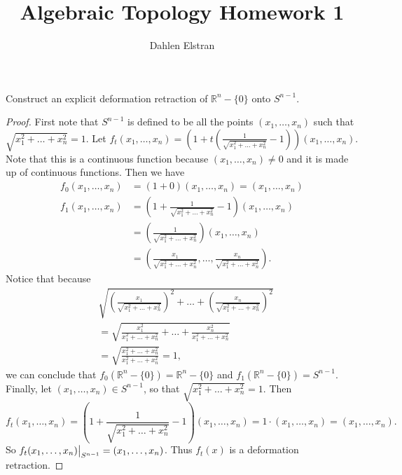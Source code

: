 \documentclass[12pt]{article}
\newenvironment{statement}[2][Statement]{\begin{trivlist}
\item[\hskip \labelsep {\bfseries #1}\hskip \labelsep {\bfseries #2.}]}{\end{trivlist}}
\newcommand{\littletaller}{\vphantom{\big|}}
\newcommand\restr[2]{{%
  \left.\kern-\nulldelimiterspace %
  #1 %
  \littletaller %
  \right|_{#2} %
  }}
\begin{document}
 
\title{Algebraic Topology Homework 1} 
\author{Dahlen Elstran} 
\maketitle

\begin{statement}[Exercise]{0.2}
    Construct an explicit deformation retraction of $\mathbb{R}^n - \{0\}$ onto $S^{n-1}$.
\end{statement}
\begin{proof}
    First note that $S^{n-1}$ is defined to be all the points $(x_1, \dots, x_n)$ such that 
    $\sqrt{x_1^2+ \dots + x_n^2}=1$. Let $f_t(x_1, \dots , x_n)=(1+t(\frac{1}{\sqrt{x_1^2 + \dots + x_n^2}} - 1))
    (x_1, \dots, x_n)$. Note that this is a continuous function because $(x_1, \dots, x_n) \neq 0$ and it is made up of 
    continuous functions. Then we have
    \begin{align*}
        f_0(x_1, \dots, x_n) &= (1+0)(x_1, \dots, x_n) = (x_1, \dots, x_n) \\
        f_1(x_1, \dots, x_n) &= (1 + \frac{1}{\sqrt{x_1^2 + \dots + x_n^2}} -1)(x_1, \dots, x_n) \\
        &= (\frac{1}{\sqrt{x_1^2 + \dots + x_n^2}})(x_1, \dots, x_n) \\
        &= (\frac{x_1}{\sqrt{x_1^2 + \dots + x_n^2}}, \dots, \frac{x_n}{\sqrt{x_1^2 + \dots + x_n^2}}).
    \end{align*}
    Notice that because 
    \begin{align*}
        & \sqrt{(\frac{x_1}{\sqrt{x_1^2 + \dots + x_n^2}})^2+ \dots + (\frac{x_n}{\sqrt{x_1^2 + \dots + x_n^2}})^2} \\
        & = \sqrt{\frac{x_1^2}{x_1^2 + \dots + x_n^2} + \dots + \frac{x_n^2}{x_1^2 + \dots + x_n^2}} \\
        & = \sqrt{\frac{x_1^2 + \dots + x_n^2}{x_1^2 + \dots + x_n^2}} = 1,
    \end{align*}
    we can conclude that $f_0(\mathbb{R}^n - \{0\})=\mathbb{R}^n - \{0\}$ and $f_1(\mathbb{R}^n - \{0\})=S^{n-1}$.
    Finally, let $(x_1, \dots, x_n) \in S^{n-1}$, so that $\sqrt{x_1^2+ \dots + x_n^2}=1$. Then 
    \begin{equation*}
        f_t(x_1, \dots, x_n)=(1+\frac{1}{\sqrt{x_1^2 + \dots + x_n^2}} - 1)(x_1, \dots, x_n) = 1 \cdot (x_1, \dots, x_n) =  (x_1, \dots, x_n).
    \end{equation*}
    So $\restr{f_t(x_1, \dots, x_n)}{S^{n-1}} = (x_1, \dots, x_n)$. Thus $f_t(x)$ is a deformation retraction.
\end{proof}
\end{document}
